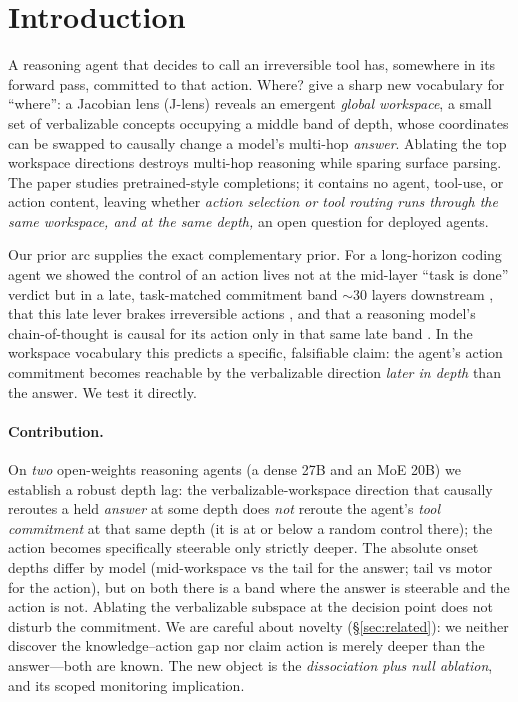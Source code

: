 \documentclass[11pt]{article}
\begin{document}
\section{Introduction}
A reasoning agent that decides to call an irreversible tool has, somewhere in its forward pass,
committed to that action. Where? \citet{anthropic2026workspace} give a sharp new vocabulary for
``where'': a Jacobian lens (J-lens) reveals an emergent \emph{global workspace}, a small set of
verbalizable concepts occupying a middle band of depth, whose coordinates can be swapped to causally
change a model's multi-hop \emph{answer}. Ablating the top workspace directions destroys multi-hop
reasoning while sparing surface parsing. The paper studies pretrained-style completions; it contains
no agent, tool-use, or action content, leaving whether \emph{action selection or tool routing runs
through the same workspace, and at the same depth,} an open question for deployed agents.

Our prior arc supplies the exact complementary prior. For a long-horizon coding agent we showed the
control of an action lives not at the mid-layer ``task is done'' verdict but in a late, task-matched
commitment band $\sim$30 layers downstream \citep{vicentino2026lever}, that this late lever brakes
irreversible actions \citep{vicentino2026brake}, and that a reasoning model's chain-of-thought is
causal for its action only in that same late band \citep{vicentino2026late}. In the workspace
vocabulary this predicts a specific, falsifiable claim: the agent's action commitment becomes
reachable by the verbalizable direction \emph{later in depth} than the answer. We test it directly.

\paragraph{Contribution.} On \emph{two} open-weights reasoning agents (a dense 27B and an MoE 20B) we
establish a robust depth lag: the verbalizable-workspace direction that causally reroutes a held
\emph{answer} at some depth does \emph{not} reroute the agent's \emph{tool commitment} at that same
depth (it is at or below a random control there); the action becomes specifically steerable only
strictly deeper. The absolute onset depths differ by model (mid-workspace vs the tail for the answer;
tail vs motor for the action), but on both there is a band where the answer is steerable and the
action is not. Ablating the verbalizable subspace at the decision point does not disturb the
commitment. We are careful about novelty (\S\ref{sec:related}): we neither discover the
knowledge--action gap nor claim action is
merely deeper than the answer---both are known. The new object is the \emph{dissociation plus null
ablation}, and its scoped monitoring implication.
\end{document}
